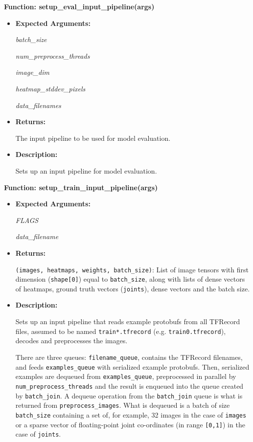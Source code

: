 \documentclass{scrreprt}
\begin{document}
\textbf{Function: setup\_eval\_input\_pipeline(args)}
\begin{itemize}
    \item \textbf{Expected Arguments:}

            \quad\textit{batch\_size}

            \quad\textit{num\_preprocess\_threads}

            \quad\textit{image\_dim}

            \quad\textit{heatmap\_stddev\_pixels}

            \quad\textit{data\_filenames}

    \item \textbf{Returns:}

            The input pipeline to be used for model evaluation.

    \item \textbf{Description:}

            Sets up an input pipeline for model evaluation.
\end{itemize}

\textbf{Function: setup\_train\_input\_pipeline(args)}
\begin{itemize}
    \item \textbf{Expected Arguments:}

            \quad\textit{FLAGS}

            \quad\textit{data\_filename}

    \item \textbf{Returns:}

            \verb|(images, heatmaps, weights, batch_size)|: List of image tensors with
                first dimension (\verb|shape[0]|) equal to \verb|batch_size|, along with
                lists of dense vectors of heatmaps, ground truth vectors
                (\verb|joints|), dense vectors and the batch size. 

    \item \textbf{Description:}

            Sets up an input pipeline that reads example protobufs from all
                TFRecord files, assumed to be named \verb|train*.tfrecord| (e.g.
                \verb|train0.tfrecord|), decodes and preprocesses the images.

            There are three queues: \verb|filename_queue|, contains the TFRecord
                filenames, and feeds \verb|examples_queue| with serialized example
                protobufs.  Then, serialized examples are dequeued from
                \verb|examples_queue|, preprocessed in parallel by
                \verb|num_preprocess_threads| and the result is enqueued into the
                queue created by \verb|batch_join|. A dequeue operation from the
                \verb|batch_join| queue is what is returned from
                \verb|preprocess_images|. What is dequeued is a batch of size
                \verb|batch_size| containing a set of, for example, 32 images in
                the case of \verb|images| or a sparse vector of floating-point joint
                co-ordinates (in range \verb|[0,1]|) in the case of \verb|joints|.

\end{itemize}
\end{document}
